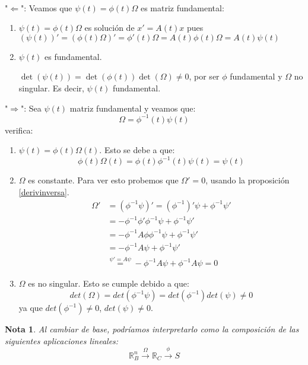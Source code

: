 \documentclass[11pt]{article}
\makeatletter
\theoremstyle{theorem-style}  %
\renewenvironment{proof}[1][\proofname]{\par
	\pushQED{\qed}%
	\normalfont \topsep6\p@\@plus6\p@\relax
	\list{}{%
		\settowidth{\leftmargin}{\quad:\hskip\labelsep}%
		\setlength{\labelwidth}{0pt}%
		\setlength{\itemindent}{-\leftmargin}%
	}%
	\item[\hskip\labelsep\itshape#1\@addpunct{:}]\ignorespaces
}{%
	\popQED\endlist\@endpefalse
}
\theoremstyle{definition-style}
\newtheorem*{note}{Nota} %
\theoremstyle{example-style}
\makeatother
\begin{document}
\begin{proof}\ \\
	"$ \Leftarrow $": Veamos que $ \psi(t)=\phi(t)\varOmega $ es matriz fundamental:
	\begin{enumerate}[\quad i)]
		\item $ \psi(t)=\phi(t)\varOmega $ es solución de $ x'=A(t)x $ pues $ (\psi(t))'=(\phi(t)\varOmega)'=\phi'(t)\varOmega=A(t)\phi(t)\varOmega =A(t)\psi(t) $
		\item $ \psi(t) $ es fundamental.
		
		$ \det (\psi(t))=\det(\phi(t))\det(\varOmega)\neq 0 $, por ser $ \phi $ fundamental y $ \varOmega $ no singular. Es decir, $ \psi(t) $ fundamental.
	\end{enumerate}
	"$ \Rightarrow$": Sea $\psi (t)$ matriz fundamental y veamos que:
	\[\varOmega = \phi^{-1} (t) \psi(t)\]
	verifica:
	\begin{enumerate}
		\item  $\psi(t) = \phi(t) \varOmega(t)$. Esto se debe a que:
		\[\phi(t) \varOmega (t) = \phi(t) \phi^{-1}(t) \psi(t) = \psi(t) \]
		\item  $\varOmega$ es constante. Para ver esto probemos que $\varOmega' = 0$, usando la proposición \ref{derivinversa}.
		\begin{align*}
			\varOmega' &= (\phi^{-1} \psi)' = (\phi^{-1})'\psi + \phi^{-1}\psi' \\ 
			&= -\phi^{-1} \phi' \phi^{-1} \psi + \phi^{-1}\psi'\\
			&= -\phi^{-1} A \phi \phi^{-1} \psi + \phi^{-1} \psi'\\
			&= -\phi^{-1} A \psi + \phi^{-1} \psi' \\
			&\stackrel{\psi' = A \psi}{=} -\phi^{-1} A \psi + \phi^{-1} A \psi = 0
		\end{align*}
		\item  $\varOmega$ es no singular. Esto se cumple debido a que:
		\[det(\varOmega) = det(\phi^{-1} \psi) = det(\phi^{-1}) det(\psi) \neq 0\]
		ya que $det(\phi^{-1}) \neq 0$, $det(\psi) \neq 0$.
	\end{enumerate}
\end{proof}
\begin{note}
	Al cambiar de base, podríamos interpretarlo como la composición de las siguientes aplicaciones lineales:
	\[\mathbb{R}^n_{B}\xrightarrow{\varOmega} \mathbb{R}_{C} \xrightarrow{\phi}S \]
\end{note}
\end{document}
